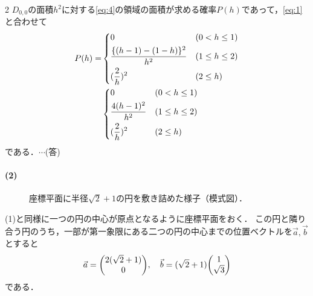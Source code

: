 \documentclass[../../main.tex]{subfiles}
\begin{document}
\begin{multicols}{2}
  $D_{0,0}$の面積$h^2$に対する\cref{eq:4}の領域の面積が求める確率$P(h)$であって，\cref{eq:1}と合わせて
  \begin{align}
    P(h) =
    &
    \begin{dcases}
      0                             & (0 < h \le 1)   \\
      \dfrac{\{(h-1)-(1-h)\}^2}{h^2} & (1 \le h \le 2) \\
      (\dfrac{2}{h})^2               & (2 \le h)
    \end{dcases} \\
    &
    \begin{dcases}
      0                    & (0 < h \le 1)   \\
      \dfrac{4(h-1)^2}{h^2} & (1 \le h \le 2) \\
      (\dfrac{2}{h})^2      & (2 \le h)
    \end{dcases}
  \end{align}
  である．$\cdots$(答)

  \paragraph{(2)}

  \begin{figure}[H]
    \centering
    \caption{座標平面に半径$\sqrt{2}+1$の円を敷き詰めた様子（模式図）．}
    \label{2001-2:fig:4}
  \end{figure}

  (1)と同様に一つの円の中心が原点となるように座標平面をおく．
  この円と隣り合う円のうち，一部が第一象限にある二つの円の中心までの位置ベクトルを$\vec{a},\vec{b}$とすると
  \begin{align}
    \vec{a} = \mqty(2(\sqrt{2}+1) \\ 0), \quad \vec{b} = (\sqrt{2}+1)\mqty(1 \\ \sqrt{3})
  \end{align}
  である．


\end{multicols}
\end{document}

